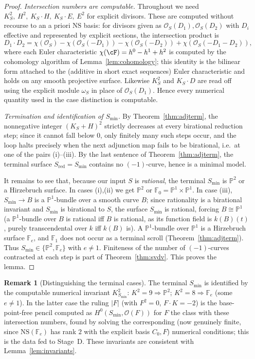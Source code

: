 \documentclass{amsart}
\theoremstyle{plain}
\theoremstyle{definition}
\newtheorem{remark}{Remark}
\newcommand{\PP}{\mathbb{P}}
\newcommand{\cO}{\mathcal{O}}
\begin{document}
\begin{proof}
\emph{Intersection numbers are computable.}  Throughout we need
$K_S^2,\ H^2,\ K_S\cdot H,\ K_S\cdot E,\ E^2$ for explicit divisors.  These are
computed without recourse to an a priori $\mathrm{NS}$ basis: for divisors given
as $\cO_S(D_1),\cO_S(D_2)$ with $D_i$ effective and represented by explicit
sections, the intersection product is
\[
D_1\cdot D_2=\chi(\cO_S)-\chi(\cO_S(-D_1))-\chi(\cO_S(-D_2))+\chi(\cO_S(-D_1-D_2)),
\]
where each Euler characteristic
$\chi(\cF)=h^0-h^1+h^2$ is computed by the cohomology algorithm of
Lemma~\ref{lem:cohomology}; this identity is the bilinear form attached to the
(additive in short exact sequences) Euler characteristic and holds on any smooth
projective surface.  Likewise $K_S^2$ and $K_S\cdot D$ are read off using the
explicit module $\omega_S$ in place of $\cO_S(D_1)$.  Hence every numerical
quantity used in the case distinction is computable.

\emph{Termination and identification of $S_{\min}$.}  By
Theorem~\ref{thm:adjterm}, the nonnegative integer $(K_S+H)^2$ strictly decreases
at every birational reduction step; since it cannot fall below $0$, only finitely
many such steps occur, and the loop halts precisely when the next adjunction map
fails to be birational, i.e.\ at one of the pairs (i)--(iii).  By the last
sentence of Theorem~\ref{thm:adjterm}, the terminal surface
$S_{\mathrm{red}}=S_{\min}$ contains no $(-1)$-curve, hence is a minimal model.

It remains to see that, because our input $S$ is \emph{rational}, the terminal
$S_{\min}$ is $\PP^2$ or a Hirzebruch surface.  In cases (i),(ii) we get $\PP^2$
or $\mathbb F_0=\PP^1\times\PP^1$.  In case (iii), $S_{\min}\to B$ is a
$\PP^1$-bundle over a smooth curve $B$; since rationality is a birational
invariant and $S_{\min}$ is birational to $S$, the surface $S_{\min}$ is rational,
forcing $B\cong\PP^1$ (a $\PP^1$-bundle over $B$ is rational iff $B$ is rational,
as its function field is $k(B)(t)$, purely transcendental over $k$ iff $k(B)$
is).  A $\PP^1$-bundle over $\PP^1$ is a Hirzebruch surface $\mathbb F_e$, and
$\mathbb F_1$ does not occur as a terminal scroll (Theorem~\ref{thm:adjterm}).
Thus $S_{\min}\in\{\PP^2,\mathbb F_e\}$ with $e\ne1$.  Finiteness of the number of
$(-1)$-curves contracted at each step is part of Theorem~\ref{thm:svdv}.  This
proves the lemma.
\end{proof}

\begin{remark}[Distinguishing the terminal cases]\label{rem:terminal}
The terminal $S_{\min}$ is identified by the computable numerical invariant
$K_{S_{\min}}^2$: $K^2=9\Rightarrow\PP^2$; $K^2=8\Rightarrow\mathbb F_e$
(some $e\ne1$).  In the latter case the ruling $|F|$ (with $F^2=0$,
$F\cdot K=-2$) is the base-point-free pencil computed as $H^0(S_{\min},\cO(F))$
for $F$ the class with these intersection numbers, found by solving the
corresponding (now genuinely finite, since $\mathrm{NS}(\mathbb F_e)$ has rank
$2$ with the explicit basis $C_0,F$) numerical conditions; this is the data fed
to Stage~D.  These invariants are consistent with
Lemma~\ref{lem:invariants}.
\end{remark}
\end{document}

